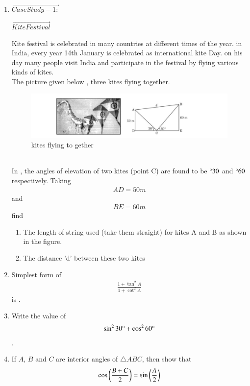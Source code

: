 \begin{enumerate}
\hfill{}\item $\vec{Case Study - 1:}$
\begin{center}
$\vec{Kite Festival}$\\
\end{center}
Kite festival is celebrated in many countries at different times of the year. in India, every year 14th
January is celebrated as international kite Day. on his day many people visit India and participate in the festival by flying various kinds of kites.
\\The picture given below  , three kites flying together.
\begin{figure}[!ht]
\centering
\includegraphics[width=\columnwidth]{cbse/figs/kites}
\caption{kites flying to gether}
\label{fig:kites5}
\end{figure}
\\In {}, the angles of elevation of two kites (point C) are found to be $\degree{30}$ and  $\degree{60}$ respectively. Taking \begin{align}AD = 50 m\end{align} and\begin{align} BE = 60 m\end{align}
find
\begin{enumerate}
\item The length of string used (take them straight) for kites A and B as shown in the figure.
\item The distance 'd' between these two kites
\end{enumerate}
\hfill{}
\item Simplest form of 
 \begin{align}
     \frac{1 + \tan^{2}{A}}{1 + \cot^{2}{A}}
 \end{align}is .

\hfill{}\item Write the value of
 \begin{align}
	     \sin^{2}{30\degree} + \cos^{2}{60\degree}
	\end{align}.
\hfill{}\item If $A$, $B$ and $C$ are interior angles of $ \triangle ABC$, then show that
	\begin{align}
	    \cos \left(\frac{B + C}{2}\right)=\sin \left(\frac{A}{2}\right)
	\end{align}
      

\end{enumerate}
